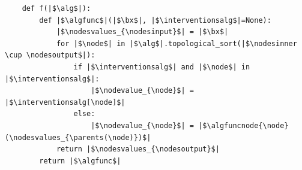 \begin{verbatim}
    def f(|$\alg$|):
        def |$\algfunc$|(|$\bx$|, |$\interventionsalg$|=None):
            |$\nodesvalues_{\nodesinput}$| = |$\bx$|
            for |$\node$| in |$\alg$|.topological_sort(|$\nodesinner \cup \nodesoutput$|):
                if |$\interventionsalg$| and |$\node$| in |$\interventionsalg$|:
                    |$\nodevalue_{\node}$| = |$\interventionsalg[\node]$|
                else:
                    |$\nodevalue_{\node}$| = |$\algfuncnode{\node}(\nodesvalues_{\parents(\node)})$|
            return |$\nodesvalues_{\nodesoutput}$|
        return |$\algfunc$|
\end{verbatim}